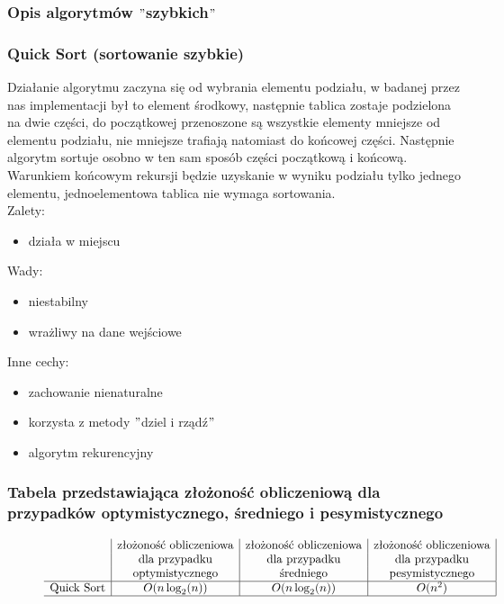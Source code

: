 \documentclass[polish,polish,a4paper]{article}
\begin{document}
\begin{spacing}{1.5}
	\subsubsection{Opis algorytmów $"$szybkich$"$}

		\subsubsection*{Quick Sort (sortowanie szybkie)}
		Działanie algorytmu zaczyna się od wybrania elementu podziału, w badanej przez nas implementacji był to element środkowy, następnie tablica zostaje podzielona na dwie części, do początkowej przenoszone są wszystkie elementy mniejsze od elementu podziału, nie mniejsze trafiają natomiast do końcowej części. Następnie algorytm sortuje osobno w ten sam sposób części początkową i końcową. Warunkiem końcowym rekursji będzie uzyskanie w wyniku podziału tylko jednego elementu, jednoelementowa tablica nie wymaga sortowania.\\
		
	Zalety:
	\begin{itemize}
		\item działa w miejscu
	\end{itemize}
	Wady:
	\begin{itemize}
		\item niestabilny
		\item wrażliwy na dane wejściowe 
	\end{itemize}
	Inne cechy:
	\begin{itemize}
		\item zachowanie nienaturalne
		\item korzysta z metody $"$dziel i rządź$"$
		\item algorytm rekurencyjny
	\end{itemize}
	
	\subsubsection*{Tabela przedstawiająca złożoność obliczeniową dla przypadków optymistycznego, średniego i pesymistycznego} 
	\begin{figure}[H]
		
		\begin{equation*}
		\begin{array}{l|c|c|c|}

		&$złożoność obliczeniowa$&$złożoność obliczeniowa$&$złożoność obliczeniowa$\\
		&$dla przypadku$&$dla przypadku$&$dla przypadku$\\
		&$optymistycznego$&$średniego$&$pesymistycznego$\\
		\hline
		$Quick Sort$&O(n\log_{2}(n))&O(n\log_{2}(n))&O(n^2)\\
		\hline
		\end{array}
		\end{equation*}
	\end{figure}
	

\end{spacing}
\end{document}
